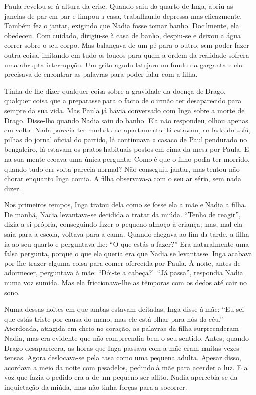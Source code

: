 Paula revelou-se à altura da crise. Quando saiu do quarto de Inga, abriu
as janelas de par em par e limpou a casa, trabalhando depressa mas
eficazmente. Também fez o jantar, exigindo que Nadia fosse tomar banho.
Docilmente, ela obedeceu. Com cuidado, dirigiu-se à casa de banho,
despiu-se e deixou a água correr sobre o seu corpo. Mas balançava de um
pé para o outro, sem poder fazer outra coisa, imitando em tudo os loucos
para quem a ordem da realidade sofrera uma abrupta interrupção. Um grito
agudo latejava no fundo da garganta e ela precisava de encontrar as
palavras para poder falar com a filha.

Tinha de lhe dizer qualquer coisa sobre a gravidade da doença de Drago,
qualquer coisa que a preparasse para o facto de o irmão ter desaparecido
para sempre da sua vida. Mas Paula já havia conversado com Inga sobre a
morte de Drago. Disse-lho quando Nadia saiu do banho. Ela não respondeu,
olhou apenas em volta. Nada parecia ter mudado no apartamento: lá
estavam, ao lado do sofá, pilhas do jornal oficial do partido, lá
continuava o casaco de Paul pendurado no bengaleiro, lá estavam os
pratos habituais postos em cima da mesa por Paula. E na sua mente ecoava
uma única pergunta: Como é que o filho podia ter morrido, quando tudo em
volta parecia normal? Não conseguiu jantar, mas tentou não chorar
enquanto Inga comia. A filha observava-a com o seu ar sério, sem
nada dizer.

Nos primeiros tempos, Inga tratou dela como se fosse ela a mãe e Nadia a
filha. De manhã, Nadia levantava-se decidida a tratar da miúda. ``Tenho
de reagir'', dizia a si própria, conseguindo fazer o pequeno-almoço à
criança; mas, mal ela saía para a escola, voltava para a cama. Quando
chegava ao fim da tarde, a filha ia ao seu quarto e perguntava-lhe: ``O
que estás a fazer?'' Era naturalmente uma falsa pergunta, porque o que
ela queria era que Nadia se levantasse. Inga acabava por lhe trazer
alguma coisa para comer oferecida por Paula. À noite, antes de adormecer, perguntava à mãe: ``Dói-te a cabeça?'' ``Já passa'', respondia Nadia
numa voz sumida. Mas ela friccionava-lhe as têmporas com os dedos até
cair no sono.

Numa dessas noites em que ambas estavam deitadas,
Inga disse à mãe: ``Eu sei que estás triste por causa do
mano, mas ele está olhar para nós do céu.'' Atordoada, atingida em cheio
no coração, as palavras da filha surpreenderam Nadia, mas era evidente
que não compreendia bem o seu sentido. Antes, quando Drago desaparecera,
as horas que Inga passava com a mãe eram muitas vezes tensas. Agora
deslocava-se pela casa como uma pequena adulta. Apesar disso, acordava a
meio da noite com pesadelos, pedindo à mãe para acender a luz. E a voz
que fazia o pedido era a de um pequeno ser aflito. Nadia apercebia-se da inquietação da miúda, mas não tinha forças para a socorrer.

